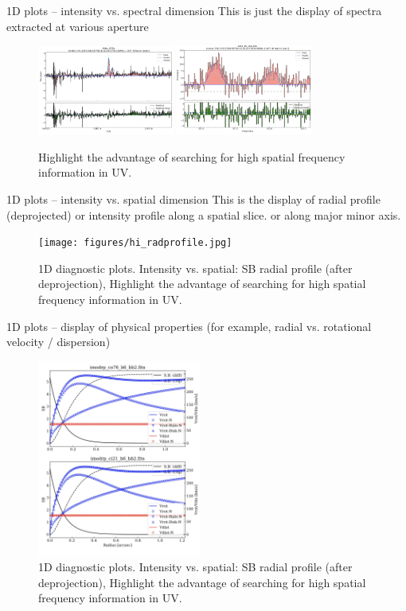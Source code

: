 \documentclass[twocolumn,tighten]{aastex62}
\begin{document}
1D plots -- intensity vs. spectral dimension
This is just the display of spectra extracted at various aperture
\begin{figure}%
\centering
\includegraphics[width=0.40\textwidth]{figures/bx610-sinfoni-spec.jpeg}
\includegraphics[width=0.40\textwidth]{figures/bx610-alma-spec.jpeg}
\caption{Highlight the advantage of searching for high spatial frequency information in UV.
}
\end{figure}

1D plots -- intensity vs. spatial dimension
This is the display of radial profile (deprojected) or intensity profile along a spatial slice. or along major minor axis.
\begin{figure}%
\centering
\texttt{[image: figures/hi\_radprofile.jpg]}
\caption{1D diagnostic plots. Intensity vs. spatial: SB radial profile (after deprojection), Highlight the advantage of searching for high spatial frequency information in UV.
}
\end{figure}

1D plots -- display of physical properties (for example, radial vs. rotational velocity / dispersion)
\begin{figure}%
\centering
\includegraphics[width=0.48\textwidth]{figures/bx610-alma-rc.jpeg}
\caption{1D diagnostic plots. Intensity vs. spatial: SB radial profile (after deprojection), Highlight the advantage of searching for high spatial frequency information in UV.
}
\end{figure}
\end{document}
